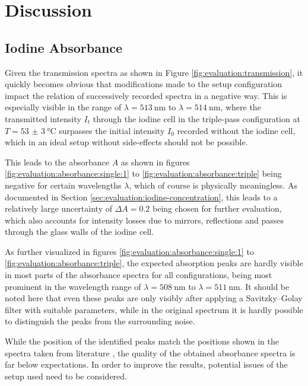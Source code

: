 \section{Discussion}
\label{sec:discussion}

\subsection{Iodine Absorbance}
\label{sec:discussion:iodine-absorbance}

Given the transmission spectra as shown in Figure \ref{fig:evaluation:transmission}, it quickly becomes obvious that modifications made to the setup configuration impact the relation of successively recorded spectra in a negative way. This is especially visible in the range of $\lambda = \SI{513}{\nm}$ to $\lambda = \SI{514}{\nm}$, where the transmitted intensity $I_t$ through the iodine cell in the triple-pass configuration at $T = \SI{53(3)}{\celsius}$ surpasses the initial intensity $I_0$ recorded without the iodine cell, which in an ideal setup without side-effects should not be possible.

This leads to the absorbance $A$ as shown in figures \ref{fig:evaluation:absorbance:single:1} to \ref{fig:evaluation:absorbance:triple} being negative for certain wavelengths $\lambda$, which of course is physically meaningless. As documented in Section \ref{sec:evaluation:iodine-concentration}, this leads to a relatively large uncertainty of $\Delta A = 0.2$ being chosen for further evaluation, which also accounts for intensity losses due to mirrors, reflections and passes through the glass walls of the iodine cell.

As further visualized in figures \ref{fig:evaluation:absorbance:single:1} to \ref{fig:evaluation:absorbance:triple}, the expected absorption peaks are hardly visible in most parts of the absorbance spectra for all configurations, being most prominent in the wavelength range of $\lambda = \SI{508}{\nm}$ to $\lambda = \SI{511}{\nm}$. It should be noted here that even these peaks are only visibly after applying a Savitzky–Golay filter with suitable parameters, while in the original spectrum it is hardly possible to distinguish the peaks from the surrounding noise.

While the position of the identified peaks match the positions shown in the spectra taken from literature \cite{Iodine}, the quality of the obtained absorbance spectra is far below expectations. In order to improve the results, potential issues of the setup used need to be considered.

